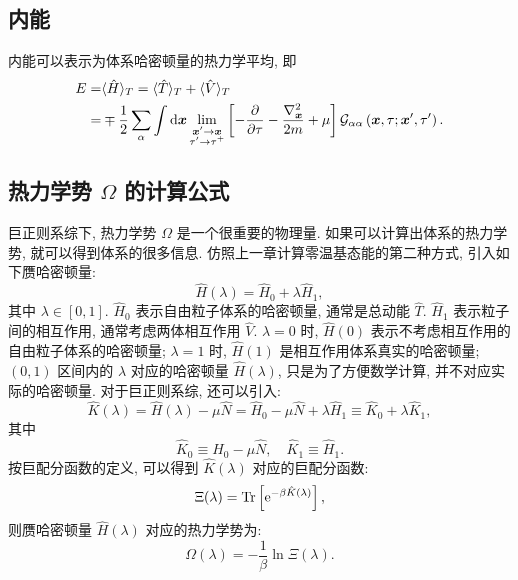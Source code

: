 \subsection{内能}
内能可以表示为体系哈密顿量的热力学平均, 即
\begin{align}
E=&\langle\hat{H}\rangle_T=\langle\hat{T}\rangle_T+\langle\hat{V}\rangle_T\nonumber\\
=&\mp \frac{1}{2} \sum_\alpha \int \mathrm{d} \boldsymbol{x} \lim _{\substack{\boldsymbol{x}^{\prime} \rightarrow \boldsymbol{x}\\ \tau^{\prime} \rightarrow \tau^{+}}}\left[-\frac{\partial}{\partial \tau}-\frac{\nabla_{\boldsymbol{x}}^2}{2 m}+\mu\right] \mathcal{G}_{\alpha \alpha}\left(\boldsymbol{x}, \tau ; \boldsymbol{x}^{\prime}, \tau^{\prime}\right) .
\end{align}

\subsection{热力学势 $\Omega$ 的计算公式}
巨正则系综下, 热力学势 $\Omega$ 是一个很重要的物理量. 如果可以计算出体系的热力学势, 就可以得到体系的很多信息. 仿照上一章计算零温基态能的第二种方式, 引入如下赝哈密顿量:
\begin{equation}
\hat{H}(\lambda)=\hat{H}_0+\lambda \hat{H}_1,
\end{equation}
其中 $\lambda \in[0,1]$. $\hat{H}_0$ 表示自由粒子体系的哈密顿量, 通常是总动能 $\hat{T}$. $\hat{H}_1$ 表示粒子间的相互作用, 通常考虑两体相互作用 $\hat{V}$. $\lambda=0$ 时, $\hat{H}(0)$ 表示不考虑相互作用的自由粒子体系的哈密顿量; $\lambda=1$ 时, $\hat{H}(1)$ 是相互作用体系真实的哈密顿量; $(0,1)$ 区间内的 $\lambda$ 对应的哈密顿量 $\hat{H}(\lambda)$, 只是为了方便数学计算, 并不对应实际的哈密顿量. 对于巨正则系综, 还可以引入:
\begin{equation}
\hat{K}(\lambda)=\hat{H}(\lambda)-\mu \hat{N}=\hat{H}_0-\mu \hat{N}+\lambda \hat{H}_1\equiv\hat{K}_0+\lambda \hat{K}_1,
\end{equation}
其中
\begin{equation}
\hat{K}_0 \equiv \hat{H}_0-\mu \hat{N}, \quad \hat{K}_1 \equiv \hat{H}_1.
\end{equation}
按巨配分函数的定义, 可以得到 $\hat{K}(\lambda)$ 对应的巨配分函数:
\begin{equation}
\Xi(\lambda)=\operatorname{Tr}\left[\mathrm{e}^{-\beta \hat{K}(\lambda)}\right],
\end{equation}
则赝哈密顿量 $\hat{H}(\lambda)$ 对应的热力学势为:
\begin{equation}
\Omega(\lambda)=-\frac{1}{\beta} \ln \Xi(\lambda) .
\end{equation}
